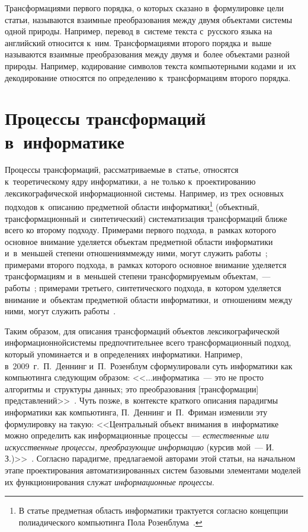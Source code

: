 \begin{multicols}{2}
  Трансформациями первого порядка, о которых сказано в~формулировке цели 
статьи, называются взаимные преобразования между двумя объектами  
сис\-те\-мы одной природы. Например, перевод в~сис\-те\-ме текста с~русского 
языка на английский относится к~ним. Трансформациями второго порядка 
и~выше называются взаимные преобразования между двумя и~более объектами 
разной природы. Например, кодирование символов текс\-та компьютерными 
кодами и~их декодирование относятся по определению к~трансформациям 
второго порядка.

  
\section{Процессы трансформаций в~информатике}


Процессы трансформаций, рассматриваемые в~статье, относятся к~теоретическому ядру информатики, а~не 
только к~проектированию лексикографической информационной сис\-те\-мы. Например, из трех основных 
подходов к~описанию предметной об\-ласти информатики\footnote{В статье предметная область информатики 
трактуется согласно концепции полиадического компьютинга Пола Розенблума~\cite{9-zac}.} (объектный, 
трансформационный и~синтетический) сис\-те\-ма\-ти\-за\-ция трансформаций ближе всего ко второму 
подходу. Примерами первого подхода, в~рамках которого основное внимание уделяется объектам предметной 
области информатики и~в~меньшей степени отношениям\linebreak между ними, могут служить  
работы~\cite{8-zac, 10-zac, 11-zac}; \mbox{примерами} второго подхода, в~рамках которого основное внимание 
уделяется трансформациям и~в~меньшей степени трансформируемым объектам,~---  
работы~\cite{12-zac, 13-zac}; примерами третьего, синтетического подхода, в~котором уделяется внимание 
и~объектам предметной об\-ласти информатики, и~отношениям между ними, могут служить работы~\cite{14-zac, 
15-zac, 16-zac, 17-zac, 18-zac}.

  Таким образом, для описания трансформаций объектов лексикографической 
информационной\linebreak системы предпочтительнее всего трансформационный 
подход, который упоминается и~в определениях информатики. Например, 
в~2009~г.\ П.~Деннинг и~П.~Розенблум сформулировали суть \mbox{информатики} как 
компьютинга следующим образом: <<$\ldots$информатика~--- это не просто 
алгоритмы и~структуры данных; это преобразования [трансформации] 
представлений>>~\cite{12-zac}. Чуть позже, в~контексте краткого описания 
парадигмы информатики как компьютинга, П.~Деннинг и~П.~Фриман изменили 
эту формулировку на такую: <<Центральный объект внимания в~информатике 
можно определить как информационные процессы~--- \textit{естественные или 
искусственные процессы, преобразующие информацию} (курсив мой~--- 
И.\,З.)>>~\cite{13-zac}. Согласно парадигме, предлагаемой авторами этой 
статьи, на начальном этапе проектирования автоматизированных систем 
базовыми элементами моделей их функционирования служат 
\textit{информационные про\-цессы}.
  

\end{multicols}
